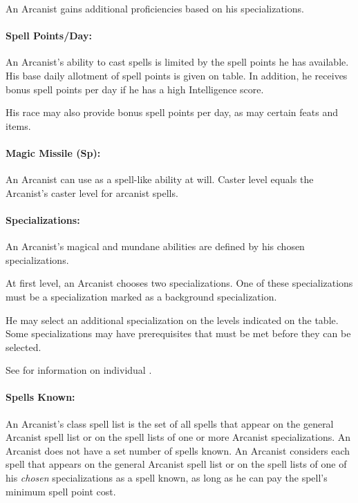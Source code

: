 An Arcanist gains additional proficiencies based on his specializations.

\paragraph{Spell Points/Day:} An Arcanist's ability to cast spells is limited by the spell points he has available. 
His base daily allotment of spell points is given on  table. 
In addition, he receives bonus spell points per day if he has a high Intelligence score.

His race may also provide bonus spell points per day, as may certain feats and items.

\paragraph{Magic Missile (Sp):}
An Arcanist can use  as a spell-like ability at will. Caster level equals the Arcanist's caster level for arcanist spells.

\paragraph{Specializations:} 
An Arcanist's magical and mundane abilities are defined by his chosen specializations. 

At first level, an Arcanist chooses two specializations. One of these specializations must be a specialization marked as a background specialization.

He may select an additional specialization on the levels indicated on the  table. Some specializations may have prerequisites that must be met before they can be selected.

See  for information on individual .

\paragraph{Spells Known:} An Arcanist's class spell list is the set of all spells that appear on the general Arcanist spell list or on the spell lists of one or more Arcanist specializations. An Arcanist does not have a set number of spells known. An Arcanist considers each spell that appears on the general Arcanist spell list or on the spell lists of one of his \emph{chosen} specializations as a spell known, as long as he can pay the spell's minimum spell point cost.

